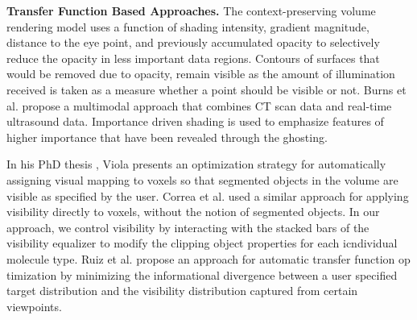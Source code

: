 \noindent
\textbf{Transfer Function Based Approaches.}
The context-preserving volume rendering model \cite{Bruckner05} uses a function of shading intensity, gradient magnitude, distance to the eye point, and previously accumulated opacity to selectively reduce the opacity in less important data regions. Contours of surfaces that would be removed due to opacity, remain visible as the amount of illumination received is taken as a measure whether a point should be visible or not.
Burns et al. \cite{Burns07} propose a multimodal approach that combines CT scan data and real-time ultrasound data. Importance driven shading is used to emphasize features of higher importance that have been revealed through the ghosting.

In his PhD thesis \cite{phd-viola}, Viola presents an optimization strategy for automatically assigning visual mapping to voxels so that segmented objects in the volume are visible as specified by the user. Correa et al. \cite{correa11} used a similar approach for applying visibility directly to voxels, without the notion of segmented objects.
In our approach, we control visibility by interacting with the stacked bars of the visibility equalizer to modify the clipping object properties for each icndividual molecule type.
Ruiz et al. \cite{ruiz11} propose an approach for automatic transfer function op
timization by minimizing the informational divergence between a user specified target distribution and the visibility distribution captured from certain viewpoints. 

